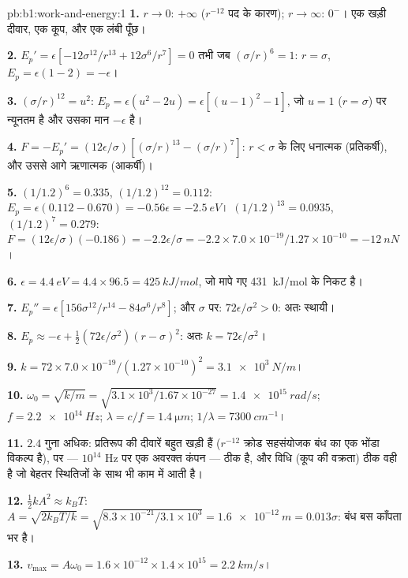 \begin{solution}{pb:b1:work-and-energy:1}
\textbf{1.} $r \to 0$: $+\infty$ ($r^{-12}$ पद के कारण); $r \to \infty$:
$0^-$। एक खड़ी दीवार, एक कूप, और एक लंबी पूँछ।

\textbf{2.} $E_p' = \epsilon[-12\sigma^{12}/r^{13} + 12\sigma^6/r^7] = 0$ तभी जब
$(\sigma/r)^6 = 1$: $r = \sigma$, $E_p = \epsilon(1 - 2) = -\epsilon$।

\textbf{3.} $(\sigma/r)^{12} = u^2$: $E_p = \epsilon(u^2 - 2u) = \epsilon[(u - 1)^2
- 1]$, जो $u = 1$ ($r = \sigma$) पर न्यूनतम है और उसका मान $-\epsilon$ है।

\textbf{4.} $F = -E_p' = (12\epsilon/\sigma)[(\sigma/r)^{13} - (\sigma/r)^7]$:
$r < \sigma$ के लिए धनात्मक (प्रतिकर्षी), और उससे आगे ऋणात्मक (आकर्षी)।

\textbf{5.} $(1/1.2)^6 = 0.335$, $(1/1.2)^{12} = 0.112$: $E_p = \epsilon(0.112
- 0.670) = -0.56\epsilon = \qty{-2.5}{eV}$। $(1/1.2)^{13} = 0.0935$,
$(1/1.2)^7 = 0.279$: $F = (12\epsilon/\sigma)(-0.186) = -2.2\epsilon/\sigma =
-2.2 \times 7.0\times10^{-19}/1.27\times10^{-10} = \qty{-12}{nN}$।

\textbf{6.} $\epsilon = \qty{4.4}{eV} = 4.4 \times 96.5 = \qty{425}{kJ/mol}$,
जो मापे गए \qty{431}{kJ/mol} के निकट है।

\textbf{7.} $E_p'' = \epsilon[156\sigma^{12}/r^{14} - 84\sigma^6/r^8]$; और
$\sigma$ पर: $72\epsilon/\sigma^2 > 0$: अतः स्थायी।

\textbf{8.} $E_p \approx -\epsilon + \tfrac12(72\epsilon/\sigma^2)(r - \sigma)^2$:
अतः $k = 72\epsilon/\sigma^2$।

\textbf{9.} $k = 72 \times 7.0\times10^{-19}/(1.27\times10^{-10})^2 =
\qty{3.1e3}{N/m}$।

\textbf{10.} $\omega_0 = \sqrt{k/m} = \sqrt{3.1\times10^3/1.67\times10^{-27}} =
\qty{1.4e15}{rad/s}$; $f = \qty{2.2e14}{Hz}$; $\lambda = c/f = \qty{1.4}{\micro m}$;
$1/\lambda = \qty{7300}{cm^{-1}}$।

\textbf{11.} $2.4$ गुना अधिक: प्रतिरूप की दीवारें बहुत खड़ी हैं
($r^{-12}$ क्रोड सहसंयोजक बंध का एक भोंडा विकल्प है), पर 
--- $10^{14}$ Hz पर एक अवरक्त कंपन --- ठीक है, और विधि (कूप की वक्रता)
ठीक वही है जो बेहतर स्थितिजों के साथ भी काम में आती है।

\textbf{12.} $\tfrac12 kA^2 \approx k_BT$: $A = \sqrt{2k_BT/k} = \sqrt{8.3\times
10^{-21}/3.1\times10^3} = \qty{1.6e-12}{m} = 0.013\sigma$: बंध बस काँपता
भर है।

\textbf{13.} $v_{\max} = A\omega_0 = 1.6\times10^{-12} \times 1.4\times10^{15}
= \qty{2.2}{km/s}$।


\end{solution}
